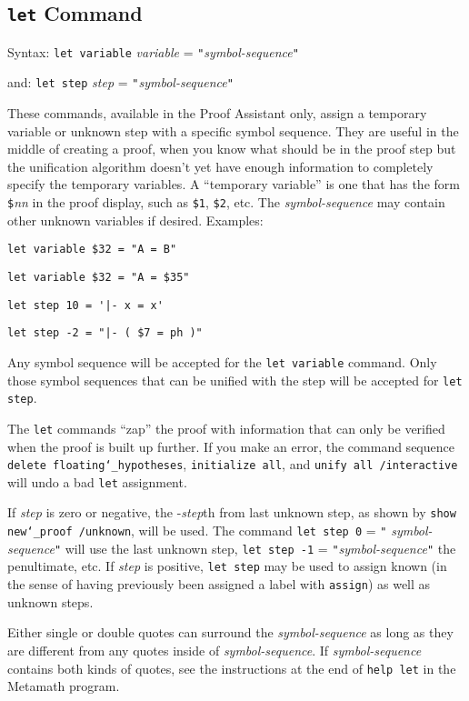 \subsection{\texttt{let} Command}
Syntax: \texttt{let variable} {\em variable} = \verb/"/{\em symbol-sequence}\verb/"/

  and: \texttt{let step} {\em step} = \verb/"/{\em symbol-sequence}\verb/"/

These commands, available in the Proof Assistant
only, assign a temporary variable or unknown
step with a specific symbol sequence.  They are useful in the middle of
creating a proof, when you know what should be in the proof step but the
unification algorithm doesn't yet have enough information to completely
specify the temporary variables.  A ``temporary variable'' is one that
has the form \texttt{\$}{\em nn} in the proof display, such as
\texttt{\$1}, \texttt{\$2}, etc.  The {\em symbol-sequence} may contain
other unknown variables if desired.  Examples:

    \verb/let variable $32 = "A = B"/

    \verb/let variable $32 = "A = $35"/

    \verb/let step 10 = '|- x = x'/

    \verb/let step -2 = "|- ( $7 = ph )"/

Any symbol sequence will be accepted for the \texttt{let variable}
command.  Only those symbol sequences that can be unified with the step
will be accepted for \texttt{let step}.

The \texttt{let} commands ``zap'' the proof with information that can
only be verified when the proof is built up further.  If you make an
error, the command sequence \texttt{delete
floating{\char`\_}hypotheses}, \texttt{initialize all}, and
\texttt{unify all /interactive} will undo a bad \texttt{let} assignment.

If {\em step} is zero or negative, the -{\em step}th from last unknown
step, as shown by \texttt{show new{\char`\_}proof /unknown}, will be
used.  The command \texttt{let step 0} = \verb/"/{\em
symbol-sequence}\verb/"/ will use the last unknown step, \texttt{let
step -1} = \verb/"/{\em symbol-sequence}\verb/"/ the penultimate, etc.
If {\em step} is positive, \texttt{let step} may be used to assign known
(in the sense of having previously been assigned a label with
\texttt{assign}) as well as unknown steps.

Either single or double quotes can surround the {\em symbol-sequence} as
long as they are different from any quotes inside of {\em
symbol-sequence}.  If {\em symbol-sequence} contains both kinds of
quotes, see the instructions at the end of \texttt{help let} in the
Metamath program.


